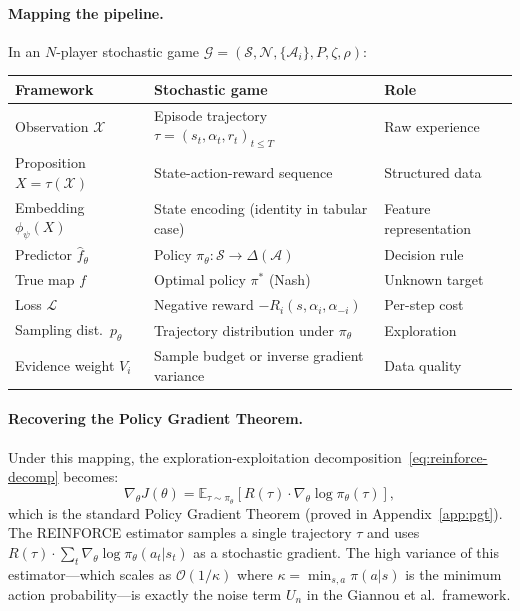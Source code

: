 \paragraph{Mapping the pipeline.} In an $N$-player stochastic game $\mathcal{G} = (\mathcal{S}, \mathcal{N}, \{\mathcal{A}_i\}, P, \zeta, \rho)$:
\begin{center}
\renewcommand{\arraystretch}{1.3}
\begin{tabular}{lll}
\hline
\textbf{Framework} & \textbf{Stochastic game} & \textbf{Role} \\
\hline
Observation $\mathcal{X}$ & Episode trajectory $\tau = (s_t, \alpha_t, r_t)_{t \leq T}$ & Raw experience \\
Proposition $X = \tau(\mathcal{X})$ & State-action-reward sequence & Structured data \\
Embedding $\phi_\psi(X)$ & State encoding (identity in tabular case) & Feature representation \\
Predictor $\hat{f}_\theta$ & Policy $\pi_\theta: \mathcal{S} \to \Delta(\mathcal{A})$ & Decision rule \\
True map $f$ & Optimal policy $\pi^*$ (Nash) & Unknown target \\
Loss $\mathcal{L}$ & Negative reward $-R_i(s, \alpha_i, \alpha_{-i})$ & Per-step cost \\
Sampling dist.\ $p_\theta$ & Trajectory distribution under $\pi_\theta$ & Exploration \\
Evidence weight $V_i$ & Sample budget or inverse gradient variance & Data quality \\
\hline
\end{tabular}
\end{center}

\paragraph{Recovering the Policy Gradient Theorem.} Under this mapping, the exploration-exploitation decomposition~\eqref{eq:reinforce-decomp} becomes:
\begin{equation}
\label{eq:pgt-from-framework}
    \nabla_\theta J(\theta) = \mathbb{E}_{\tau \sim \pi_\theta}\!\left[R(\tau) \cdot \nabla_\theta \log \pi_\theta(\tau)\right],
\end{equation}
which is the standard Policy Gradient Theorem (proved in Appendix~\ref{app:pgt}). The REINFORCE estimator samples a single trajectory $\tau$ and uses $R(\tau) \cdot \sum_t \nabla_\theta \log \pi_\theta(a_t | s_t)$ as a stochastic gradient. The high variance of this estimator---which scales as $\mathcal{O}(1/\kappa)$ where $\kappa = \min_{s,a} \pi(a|s)$ is the minimum action probability---is exactly the noise term $U_n$ in the Giannou et al.\ framework.

